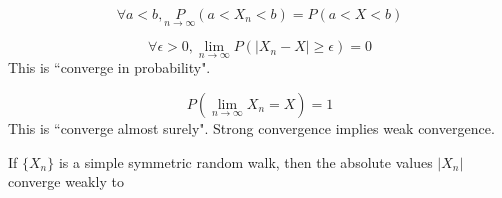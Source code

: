 \documentclass[11pt]{article}
\begin{document}
    $$\forall a < b, \underset{n \rightarrow \infty} P(a < X_n < b) = P(a < X < b)$$

    $$\forall \epsilon > 0, \underset{n \rightarrow \infty}{\lim} P(|X_n - X| \geq \epsilon) = 0$$
    \remark This is ``converge in probability".
    
    $$P(\underset{n \rightarrow \infty}{\lim} X_n = X) = 1$$
    \remark This is ``converge almost surely".
    \remark Strong convergence implies weak convergence.
    
    
    \proposition If $\{X_n\}$ is a simple symmetric random walk, then the absolute values $|X_n|$ converge weakly to 
    
    
    
    
    
    
    
    
    
    
    
\end{document}
